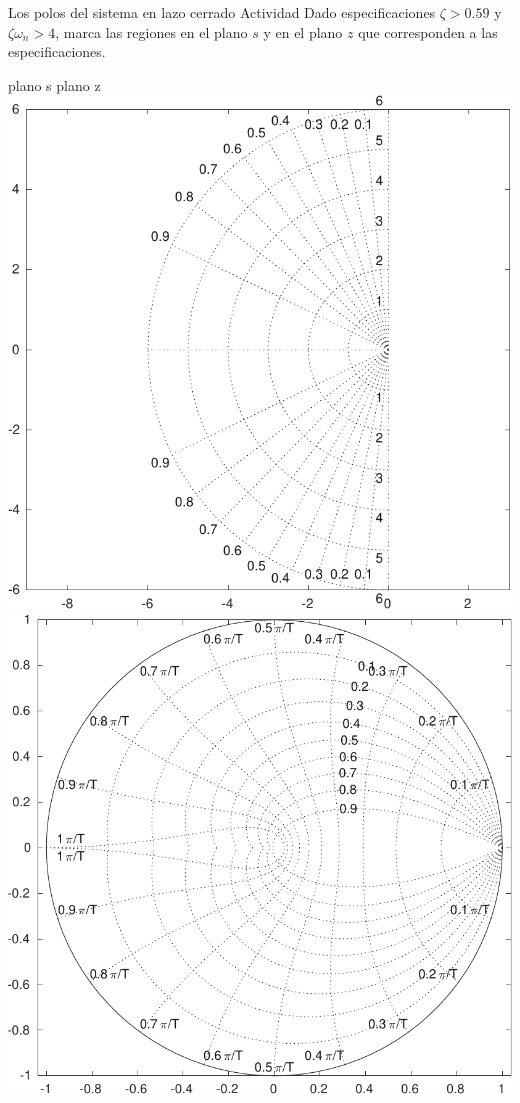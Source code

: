 \documentclass[presentation,aspectratio=169]{beamer}
\begin{document}
\begin{frame}[label={sec:org9d67f1d}]{Los polos del sistema en lazo cerrado}
\alert{Actividad} Dado especificaciones \(\zeta > 0.59\) y \(\zeta\omega_n > 4\), marca las regiones en el plano \(s\) y en el plano \(z\) que corresponden a las especificaciones.
\begin{center}
\alert{plano s} \hspace*{0.4\linewidth} \alert{plano z}\\
\includegraphics[height=0.61\textheight]{../../figures/sgrid-crop} \hspace*{3mm}
\includegraphics[height=0.6\textheight]{../../figures/zgrid-crop}\\
\end{center}
\end{frame}
\end{document}
